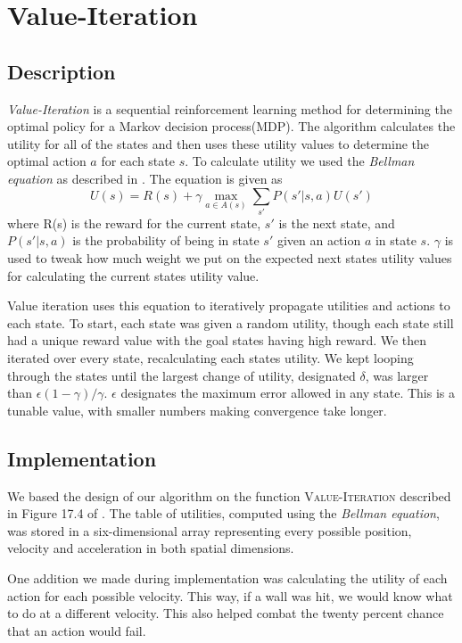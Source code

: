 \documentclass{article}
\begin{document}
	\section{Value-Iteration}
	\subsection{Description}
	\textit{Value-Iteration} is a sequential reinforcement learning method for determining the optimal policy for a Markov decision process(MDP)\cite{Yu2013}. The algorithm calculates the utility for all of the states and then uses these utility values to determine the optimal action $a$ for each state $s$. To calculate utility we used the \textit{Bellman equation} as described in \cite{ai}. The equation is given as			
	\begin{equation}
	U(s) = R(s) + \gamma \max_{a \in A(s)}\sum_{s'} P(s'|s,a)U(s')
	\end{equation}
	where R(s) is the reward for the current state, $s'$ is the next state, and $P(s'|s,a)$ is the probability of being in state $s'$ given an action $a$ in state $s$. $\gamma$ is used to tweak how much weight we put on the expected next states utility values for calculating the current states utility value.
	
	Value iteration uses this equation to iteratively propagate utilities and actions to each state. To start, each state was given a random utility, though each state still had a unique reward value with the goal states having high reward. We then iterated over every state, recalculating each states utility. We kept looping through the states until the largest change of utility, designated $\delta$, was larger than $\epsilon(1-\gamma)/\gamma$. $\epsilon$ designates the maximum error allowed in any state. This is a tunable value, with smaller numbers making convergence take longer.
	\subsection{Implementation}
	
	We based the design of our algorithm on the function \textsc{Value-Iteration} described in Figure 17.4 of \cite{ai}. 
	The table of utilities, computed using the \textit{Bellman equation}, was stored in a six-dimensional array representing every possible position, velocity and acceleration in both spatial dimensions.
	
	One addition we made during implementation was calculating the utility of each action for each possible velocity. This way, if a wall was hit, we would know what to do at a different velocity. This also helped combat the twenty percent chance that an action would fail.
	
\end{document}
